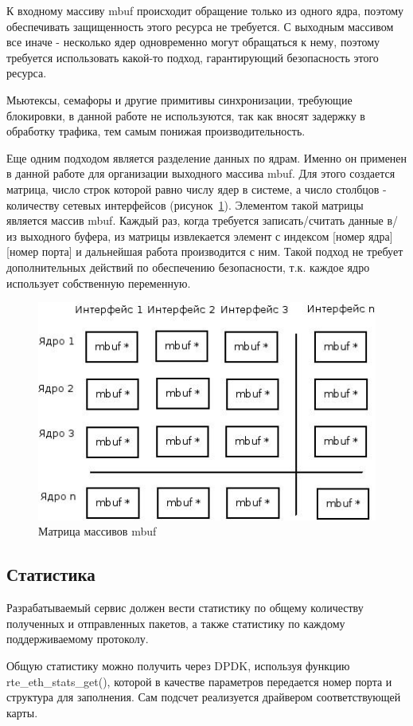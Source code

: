 К входному массиву mbuf происходит обращение только из одного ядра, поэтому обеспечивать защищенность этого ресурса не требуется. С выходным массивом все иначе - несколько ядер одновременно могут обращаться к нему, поэтому требуется использовать какой-то подход, гарантирующий безопасность этого ресурса.

Мьютексы, семафоры и другие примитивы синхронизации, требующие блокировки, в данной работе не используются, так как вносят задержку в обработку трафика, тем самым понижая производительность.

Еще одним подходом является разделение данных по ядрам. Именно он применен в данной работе для организации выходного массива mbuf. Для этого создается матрица, число строк которой равно числу ядер в системе, а число столбцов - количеству сетевых интерфейсов (рисунок~\ref{pic:mbuf_matrix}). Элементом такой матрицы является массив mbuf. Каждый раз, когда требуется записать/считать данные в/из выходного буфера, из матрицы извлекается элемент с индексом [номер ядра][номер порта] и дальнейшая работа производится с ним. Такой подход не требует дополнительных действий по обеспечению безопасности, т.к. каждое ядро использует собственную переменную.
\begin{figure}
\centering
\includegraphics[scale=0.6]{pictures/mbuf_matrix}
\caption{Матрица массивов mbuf}
\label{pic:mbuf_matrix}
\end{figure}

\subsection{Статистика}
Разрабатываемый сервис должен вести статистику по общему количеству полученных и отправленных пакетов, а также статистику по каждому поддерживаемому протоколу.

Общую статистику можно получить через DPDK, используя функцию rte\_eth\_stats\_get(), которой в качестве параметров передается номер порта и структура для заполнения. Сам подсчет реализуется драйвером соответствующей карты.

